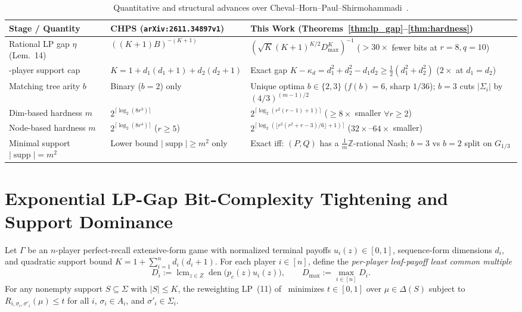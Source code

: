 \documentclass[11pt,a4paper]{article}
\theoremstyle{remark}
\newcommand{\supp}{\operatorname{supp}}
\newcommand{\lcm}{\operatorname{lcm}}
\newcommand{\den}{\operatorname{den}}
\newcommand{\Z}{\mathbb{Z}}
\begin{document}
\begin{table}[htbp]
\centering
\caption{Quantitative and structural advances over Cheval--Horn--Paul--Shirmohammadi~\cite{CHPS2026}.}
\label{tab:summary}
\scriptsize
\setlength{\tabcolsep}{4pt}
\begin{tabular}{@{} >{\raggedright\arraybackslash}p{} >{\raggedright\arraybackslash}p{} >{\raggedright\arraybackslash}p{} @{}}
\toprule
\textbf{Stage / Quantity} & \textbf{CHPS (\nolinkurl{arXiv:2611.34897v1})} & \textbf{This Work (Theorems~\ref{thm:lp_gap}--\ref{thm:hardness})} \\
\midrule
Rational LP gap $\eta$ (Lem.~14) & $((K+1)B)^{-(K+1)}$ & $(\sqrt{K}(K+1)^{K/2}D_{\max}^K)^{-1}$ ($>30\times$ fewer bits at $r=8,q=10$) \\
2-player support cap & $K = 1+d_1(d_1+1)+d_2(d_2+1)$ & Exact gap $K-\kappa_d = d_1^2+d_2^2-d_1d_2 \ge \frac{1}{2}(d_1^2+d_2^2)$ ($2\times$ at $d_1=d_2$) \\
Matching tree arity $b$ & Binary ($b=2$) only & Unique optima $b\in\{2,3\}$ ($f(b)=6$, sharp $1/36$); $b=3$ cuts $|\Sigma_i|$ by $(4/3)^{(m-1)/2}$ \\
Dim-based hardness $m$ & $2^{\lceil\log_2(8r^3)\rceil}$ & $2^{\lceil\log_2(r^2(r-1)+1)\rceil}$ ($\ge 8\times$ smaller $\forall r\ge 2$) \\
Node-based hardness $m$ & $2^{\lceil\log_2(8r^4)\rceil}$ ($r\ge 5$) & $2^{\lceil\log_2(\lfloor r^2(r^2+r-3)/6\rfloor + 1)\rceil}$ ($32\times$--$64\times$ smaller) \\
Minimal support $|\supp|=m^2$ & Lower bound $|\supp|\ge m^2$ only & Exact iff: $(P,Q)$ has a $\frac{1}{m}\Z$-rational Nash; $b=3$ vs $b=2$ split on $G_{1/3}$ \\
\bottomrule
\end{tabular}
\end{table}

\section{Exponential LP-Gap Bit-Complexity Tightening and Support Dominance}\label{sec:lp_gap}

Let $\Gamma$ be an $n$-player perfect-recall extensive-form game with normalized terminal payoffs $u_i(z) \in [0,1]$, sequence-form dimensions $d_i$, and quadratic support bound $K = 1 + \sum_{i=1}^n d_i(d_i+1)$. For each player $i \in [n]$, define the \emph{per-player leaf-payoff least common multiple}
\begin{equation}\label{eq:Di_def}
  D_i := \lcm_{z \in Z} \den\bigl(p_c(z) u_i(z)\bigr), \qquad D_{\max} := \max_{i \in [n]} D_i.
\end{equation}
For any nonempty support $S \subseteq \Sigma$ with $|S| \le K$, the reweighting LP~(11) of~\cite{CHPS2026} minimizes $t \in [0,1]$ over $\mu \in \Delta(S)$ subject to $R_{i,\sigma_i,\sigma'_i}(\mu) \le t$ for all $i$, $\sigma_i \in A_i$, and $\sigma'_i \in \Sigma_i$.
\end{document}
